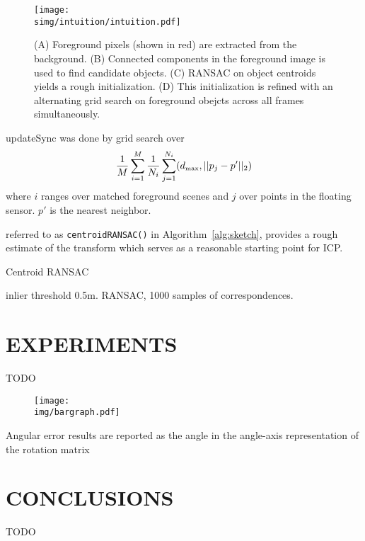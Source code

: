 \documentclass[letterpaper, 10 pt, conference]{ieeeconf}  %
\newcommand{\img}{img}
\newcommand{\simg}{static_img}
\begin{document}
\begin{figure*}
  \centering
  \texttt{[image: \\simg/intuition/intuition.pdf]}
  \caption{(A) Foreground pixels (shown in red) are extracted from the background. (B) Connected components in the foreground image is used to find candidate objects. (C) RANSAC on object centroids yields a rough initialization. (D) This initialization is refined with an alternating grid search on foreground obejcts across all frames simultaneously. }
  \label{fig:}
\end{figure*}


updateSync was done by grid search over
\newcommand{\dmax}{d_{\mbox{\tiny{max}}}}
\begin{align*}
  \frac{1}{M} \sum_{i=1}^M \frac{1}{N_i} \sum_{j=1}^{N_i}    (\dmax, ||p_j - p'||_2)
\end{align*}
where $i$ ranges over matched foreground scenes and $j$ over points in the floating sensor.  $p'$ is the nearest neighbor.


referred to as \texttt{centroidRANSAC()} in Algorithm~\ref{alg:sketch}, provides a rough estimate of the transform which serves as a reasonable starting point for ICP.


\begin{algorithm}
  \caption{Centroid RANSAC}
  \label{alg:cal}
  \SetLine
  \phantom{\;}
  inlier threshold 0.5m.  RANSAC, 1000 samples of correspondences.
\end{algorithm}



\section{EXPERIMENTS}
TODO



\begin{figure}
  \centering
  \texttt{[image: \\img/bargraph.pdf]}
  \caption{}
  \label{fig:bargraph}
\end{figure}

\begin{figure}
  \centering
  
  \label{fig:results}
\end{figure}

Angular error results are reported as the angle in the angle-axis representation of the rotation matrix 

\section{CONCLUSIONS}
TODO



\end{document}
